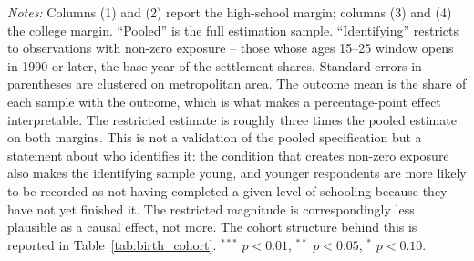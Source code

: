 \begin{table}[!htbp]
\centering
\caption{Pooled Sample versus Identifying Subsample, Both Education Margins}
\label{tab:exposure_missing}
\begin{minipage}{\textwidth}
\footnotesize
\vspace{4pt}
\textit{Notes:} Columns (1) and (2) report the high-school margin; columns (3) and (4) the college margin. ``Pooled'' is the full estimation sample. ``Identifying'' restricts to observations with non-zero exposure -- those whose ages 15--25 window opens in 1990 or later, the base year of the settlement shares. Standard errors in parentheses are clustered on metropolitan area. The outcome mean is the share of each sample with the outcome, which is what makes a percentage-point effect interpretable. The restricted estimate is roughly three times the pooled estimate on both margins. This is not a validation of the pooled specification but a statement about who identifies it: the condition that creates non-zero exposure also makes the identifying sample young, and younger respondents are more likely to be recorded as not having completed a given level of schooling because they have not yet finished it. The restricted magnitude is correspondingly less plausible as a causal effect, not more. The cohort structure behind this is reported in Table~\ref{tab:birth_cohort}. $^{***}$ $p<0.01$, $^{**}$ $p<0.05$, $^{*}$ $p<0.10$.
\end{minipage}
\end{table}

